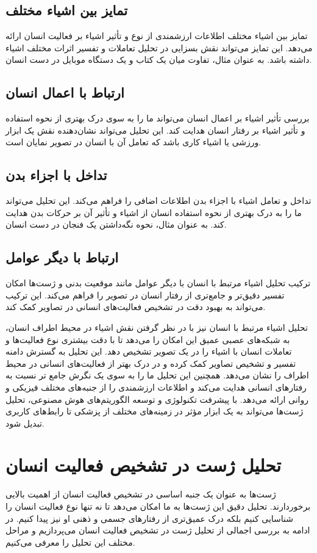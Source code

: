 \subsection{تمایز بین اشیاء مختلف}
تمایز بین اشیاء مختلف اطلاعات ارزشمندی از نوع و تأثیر اشیاء بر فعالیت انسان ارائه می‌دهد. این تمایز می‌تواند نقش بسزایی در تحلیل تعاملات و تفسیر اثرات مختلف اشیاء داشته باشد. به عنوان مثال، تفاوت میان یک کتاب و یک دستگاه موبایل در دست انسان.
\subsection{ارتباط با اعمال انسان}
بررسی تأثیر اشیاء بر اعمال انسان می‌تواند ما را به سوی درک بهتری از نحوه استفاده و تأثیر اشیاء بر رفتار انسان هدایت کند. این تحلیل می‌تواند نشان‌دهنده نقش یک ابزار ورزشی یا اشیاء کاری باشد که تعامل آن با انسان در تصویر نمایان است.
\subsection{تداخل با اجزاء بدن}
تداخل و تعامل اشیاء با اجزاء بدن اطلاعات اضافی را فراهم می‌کند. این تحلیل می‌تواند ما را به درک بهتری از نحوه استفاده انسان از اشیاء و تأثیر آن بر حرکات بدن هدایت کند. به عنوان مثال، نحوه نگه‌داشتن یک فنجان در دست انسان.
\subsection{ارتباط با دیگر عوامل}
ترکیب تحلیل اشیاء مرتبط با انسان با دیگر عوامل مانند موقعیت بدنی و ژست‌ها امکان تفسیر دقیق‌تر و جامع‌تری از رفتار انسان در تصویر را فراهم می‌کند. این ترکیب می‌تواند به بهبود دقت در تشخیص فعالیت‌های انسانی در تصاویر کمک کند.

تحلیل اشیاء مرتبط با انسان نیز با در نظر گرفتن نقش اشیاء در محیط اطراف انسان، به شبکه‌های عصبی عمیق این امکان را می‌دهد تا با دقت بیشتری نوع فعالیت‌ها و تعاملات انسان با اشیاء را در یک تصویر تشخیص دهد. این تحلیل به گسترش دامنه تفسیر و تشخیص تصاویر کمک کرده و در درک بهتر از فعالیت‌های انسانی در محیط اطراف را نشان می‌دهد. همچنین این تحلیل ما را به سوی یک نگرش جامع تر نسبت به رفتارهای انسانی هدایت می‌کند و اطلاعات ارزشمندی را از جنبه‌های مختلف فیزیکی و روانی ارائه می‌دهد. با پیشرفت تکنولوژی و توسعه الگوریتم‌های هوش مصنوعی، تحلیل ژست‌ها می‌تواند به یک ابزار مؤثر در زمینه‌های مختلف از پزشکی تا رابط‌های کاربری تبدیل شود.
\section{تحلیل ژست در تشخیص فعالیت انسان}
ژست‌ها به عنوان یک جنبه اساسی در تشخیص فعالیت انسان از اهمیت بالایی برخوردارند. تحلیل دقیق این ژست‌ها به ما امکان می‌دهد تا نه تنها نوع فعالیت انسان را شناسایی کنیم بلکه درک عمیق‌تری از رفتارهای جسمی و ذهنی او نیز پیدا کنیم. در ادامه به بررسی اجمالی از تحلیل ژست در تشخیص فعالیت انسان می‌پردازیم و مراحل مختلف این تحلیل را معرفی می‌کنیم.
